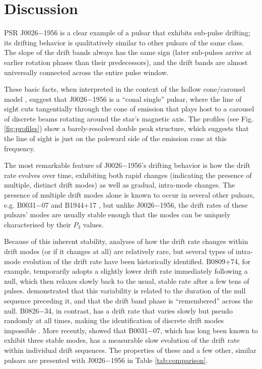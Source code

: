 \documentclass[twocolumn]{aastex631}
\newcommand{\psr}{J0026$-$1956}
\begin{document}
\section{Discussion}
\label{sec:discussion}

PSR \psr{} is a clear example of a pulsar that exhibits sub-pulse drifting; its drifting behavior is qualitatively similar to other pulsars of the same class.
The slope of the drift bands always has the same sign (later sub-pulses arrive at earlier rotation phases than their predecessors), and the drift bands are almost universally connected across the entire pulse window.

These basic facts, when interpreted in the context of the hollow cone/carousel model \citep{Ruderman1975,Rankin1986,Deshpande1999}, suggest that \psr{} is a ``conal single'' pulsar, where the line of sight cuts tangentially through the cone of emission that plays host to a carousel of discrete beams rotating around the star's magnetic axis.
The profiles (see Fig. \ref{fig:profiles}) show a barely-resolved double peak structure, which suggests that the line of sight is just on the poleward side of the emission cone at this frequency.

The most remarkable feature of \psr{}'s drifting behavior is how the drift rate evolves over time, exhibiting both rapid changes (indicating the presence of multiple, distinct drift modes) as well as gradual, intra-mode changes.
The presence of multiple drift modes alone is known to occur in several other pulsars, e.g. B0031$-$07 \citep{Huguenin1970,Joshi2000} and B1944$+$17 \citep{Deich1986,Kloumann2010}, but unlike \psr{}, the drift rates of these pulsars' modes are usually stable enough that the modes can be uniquely characterised by their $P_3$ values.

Because of this inherent stability, analyses of how the drift rate changes within drift modes (or if it changes at all) are relatively rare, but several types of intra-mode evolution of the drift rate have been historically identified.
B0809$+$74, for example, temporarily adopts a slightly lower drift rate immediately following a null, which then relaxes slowly back to the usual, stable rate after a few tens of pulses.
\citet{Lyne1983} demonstrated that this variability is related to the duration of the null sequence preceding it, and that the drift band phase is ``remembered'' across the null.
B0826$-$34, in contrast, has a drift rate that varies slowly but pseudo randomly at all times, making the identification of discrete drift modes impossible \citep[e.g.][]{Esamdin2012}.
More recently, \citet{McSweeney2017} showed that B0031$-$07, which has long been known to exhibit three stable modes, has a measurable slow evolution of the drift rate within individual drift sequences.
The properties of these and a few other, similar pulsars are presented with \psr{} in Table \ref{tab:comparison}.
\end{document}
